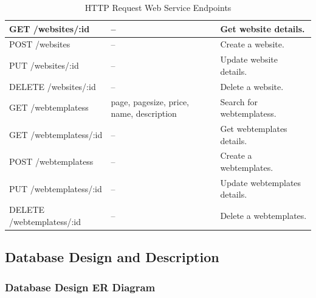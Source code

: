 \documentclass{article}
\begin{document}
\begin{table}
\begin{tabular}{|l|p{4.5cm}|l|}
         GET /websites/:id & -- & Get website details. \\\hline
         POST /websites & -- & Create a website. \\\hline
         PUT /websites/:id & -- & Update website details. \\\hline
         DELETE /websites/:id & -- & Delete a website. \\\hline
         GET /webtemplatess & page, pagesize, price, name, description & Search for webtemplatess. \\\hline
         GET /webtemplatess/:id & -- & Get webtemplates details. \\\hline
         POST /webtemplatess & -- & Create a webtemplates. \\\hline
         PUT /webtemplatess/:id & -- & Update webtemplates details. \\\hline
         DELETE /webtemplatess/:id & -- & Delete a webtemplates. \\\hline
    \end{tabular}
    \caption{HTTP Request Web Service Endpoints}
    \label{endpoints}
\end{table}


\pagebreak
\subsection{Database Design and Description}

\subsubsection{Database Design ER Diagram}
\label{dded}
\end{document}
